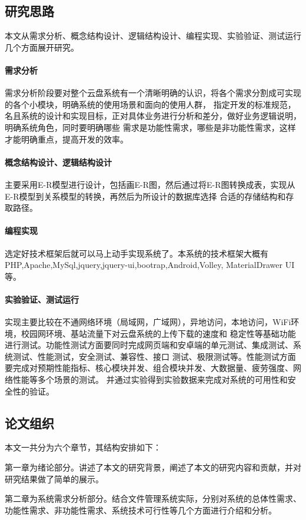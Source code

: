 \subsection{研究思路}
本文从需求分析、概念结构设计、逻辑结构设计、编程实现、实验验证、测试运行几个方面展开研究。
\paragraph{需求分析}
需求分析阶段要对整个云盘系统有一个清晰明确的认识，将各个需求分割成可实现的各个小模块，明确系统的使用场景和面向的使用人群，
指定开发的标准规范，名且系统的设计和实现目标，正对具体业务进行分析和差分，做好业务逻辑说明，明确系统角色，同时要明确哪些
需求是功能性需求，哪些是非功能性需求，这样才能明确重点，提高开发的效率。
\paragraph{概念结构设计、逻辑结构设计}
主要采用E-R模型进行设计，包括画E-R图，然后通过将E-R图转换成表，实现从E-R模型到关系模型的转换，再然后为所设计的数据库选择
合适的存储结构和存取路径。
\paragraph{编程实现}
选定好技术框架后就可以马上动手实现系统了。本系统的技术框架大概有PHP,Apache,MySql,jquery,jquery-ui,bootrap,Android,Volley,
MaterialDrawer UI等。
\paragraph{实验验证、测试运行}
实现主要比较在不通网络环境（局域网，广域网），异地访问，本地访问，WiFi环境，校园网环境、基站流量下对云盘系统的上传下载的速度和
稳定性等基础功能进行测试。功能性测试方面要同时完成网页端和安卓端的单元测试、集成测试、系统测试、性能测试，安全测试、兼容性、接口
测试、极限测试等。性能测试方面要完成对预期性能指标、核心模块并发、组合模块并发、大数据量、疲劳强度、网络性能等多个场景的测试。
并通过实验得到实验数据来完成对系统的可用性和安全性的验证。

\subsection{论文组织}
本文一共分为六个章节，其结构安排如下：

第一章为绪论部分。讲述了本文的研究背景，阐述了本文的研究内容和贡献，并对研究结果做了简单的展示。

第二章为系统需求分析部分。结合文件管理系统实际，分别对系统的总体性需求、功能性需求、非功能性需求、系统技术可行性等几个方面进行介绍和分析。

